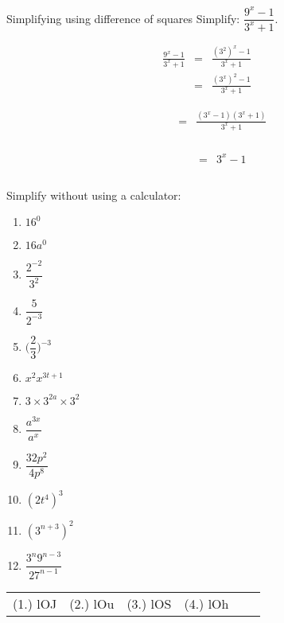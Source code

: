 \begin{wex}
{Simplifying using difference of squares}
{Simplify: $\dfrac{9^x-1}{3^x+1}$.}
{
\begin{eqnarray*}
 \frac{9^x-1}{3^x+1} & = & \frac{(3^2)^x -1}{3^x+1} \\
		     & = & \frac{(3^x)^2-1}{3^x+1} 
\end{eqnarray*}

\begin{eqnarray*}
 \phantom{\frac{9^x-1}{3^x+1}} & = & \frac{(3^x-1)(3^x+1)}{3^x+1}\\
\end{eqnarray*}

\begin{eqnarray*}
 \phantom{\frac{9^x-1}{3^x+1}} & = & 3^x-1\\
\end{eqnarray*}
}
\end{wex}


\begin{exercises}{}{
Simplify without using a calculator:
\begin{multicols}{2}
\begin{enumerate}[label=\textbf{\arabic*}., itemsep=5pt]
 \item $16^0$
 \item $16a^0$
 \item $\dfrac{2^{-2}}{3^2}$
 \item $ \dfrac{5}{2^{-3}}$
 \item $ \Big(\dfrac{2}{3}\Big)^{-3} $
 \item $ x^2 x^{3t+1} $
 \item $ 3 \times 3^{2a} \times 3^2$
 \item $ \dfrac{a^{3x}}{a^x} $
 \item $ \dfrac{32p^2}{4p^8}$
 \item $ (2t^4)^3$
 \item $ (3^{n+3})^2$
 \item $ \dfrac{3^n 9^{n-3}}{27^{n-1}}$
\end{enumerate}
\end{multicols}
\practiceinfo
\par \practiceinfo
\begin{tabular}[h]{cccccc}
(1.) lOJ  &  (2.) lOu  &  (3.) lOS  &  (4.) lOh  & 
\end{tabular}
}
\end{exercises}

